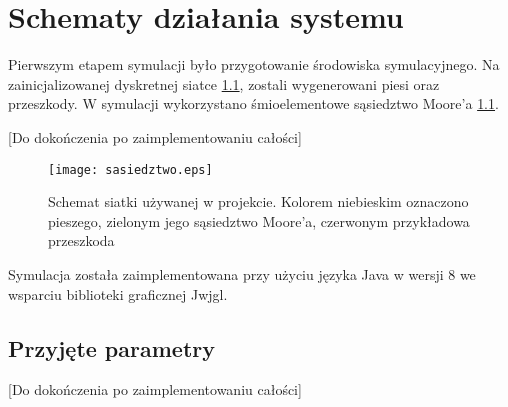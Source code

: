 \chapter{Schematy działania systemu}
\label{cha:schematy}

Pierwszym etapem symulacji było przygotowanie środowiska symulacyjnego. Na zainicjalizowanej dyskretnej siatce \ref{figure:siatka}, zostali wygenerowani piesi oraz przeszkody. W symulacji wykorzystano śmioelementowe sąsiedztwo Moore'a \ref{figure:siatka}.

[Do dokończenia po zaimplementowaniu całości]
\begin{figure}
\label{figure:siatka}
\centering
\texttt{[image: sasiedztwo.eps]}
\caption{Schemat siatki używanej w projekcie. Kolorem niebieskim oznaczono pieszego, zielonym jego sąsiedztwo Moore'a, czerwonym przykładowa przeszkoda}
\end{figure}

Symulacja została zaimplementowana przy użyciu języka Java w wersji 8 we wsparciu biblioteki graficznej Jwjgl.

\section{Przyjęte parametry}
[Do dokończenia po zaimplementowaniu całości]
